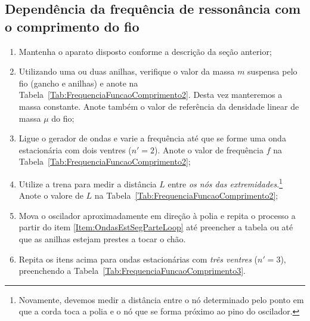 \subsection{Dependência da frequência de ressonância com o comprimento do fio}

\begin{enumerate}
\item Mantenha o aparato disposto conforme a descrição da seção anterior;
\item Utilizando uma ou duas anilhas, verifique o valor da massa $m$ suspensa pelo fio (gancho e anilhas) e anote na Tabela~\ref{Tab:FrequenciaFuncaoComprimento2}. Desta vez manteremos a massa constante. Anote também o valor de referência da densidade linear de massa $\mu$ do fio;
\item Ligue o gerador de ondas e varie a frequência até que se forme uma onda estacionária com dois ventres ($n' = 2$). Anote o valor de frequência $f$ na Tabela~\ref{Tab:FrequenciaFuncaoComprimento2};\label{Item:OndasEstSegParteLoop}
\item Utilize a trena para medir a distância $L$ entre \emph{os nós das extremidades}.\footnote{Novamente, devemos medir a distância entre o nó determinado pelo ponto em que a corda toca a polia e o nó que se forma próximo ao pino do oscilador.} Anote o valore de $L$ na Tabela~\ref{Tab:FrequenciaFuncaoComprimento2};
\item Mova o oscilador aproximadamente  em direção à polia e repita o processo a partir do item \ref{Item:OndasEstSegParteLoop} até preencher a tabela ou até que as anilhas estejam prestes a tocar o chão.
\item Repita os itens acima para ondas estacionárias com \emph{três ventres} ($n' = 3$), preenchendo a Tabela~\ref{Tab:FrequenciaFuncaoComprimento3}.
\end{enumerate}

\cleardoublepage


\vspace{15mm}

